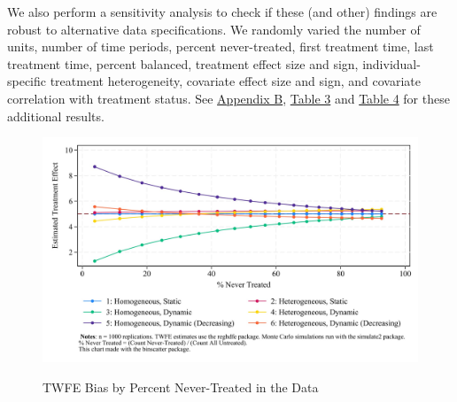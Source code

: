 \documentclass[12pt]{article}
\begin{document}
We also perform a sensitivity analysis to check if these (and other) findings are robust to alternative data specifications. We randomly varied the number of units, number of time periods, percent never-treated, first treatment time, last treatment time, percent balanced, treatment effect size and sign, individual-specific treatment heterogeneity, covariate effect size and sign, and covariate correlation with treatment status. See \hyperref[sec:appendixb]{Appendix B}, \hyperref[tab:sensitivity-table]{Table 3} and \hyperref[tab:sensitivity-table-interact]{Table 4} for these additional results.
\begin{figure}[H]
    \centering
    \caption{TWFE Bias by Percent Never-Treated in the Data}
    \includegraphics[width=6in]{Figures/TWFE Bias by Percent Never Treated.jpg}
    \label{fig:pc-nevertreat}
\end{figure}
\end{document}
